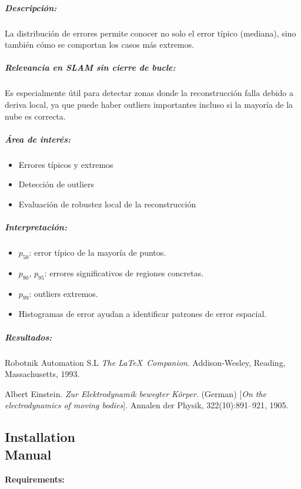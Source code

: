 \documentclass[12pt, a4paper, twoside]{article}
\begin{document}
\subparagraph{Descripción:}
La distribución de errores permite conocer no solo el error típico (mediana), sino también cómo se comportan los casos más extremos.

\subparagraph{Relevancia en SLAM sin cierre de bucle:}
Es especialmente útil para detectar zonas donde la reconstrucción falla debido a deriva local, ya que puede haber outliers 
importantes incluso si la mayoría de la nube es correcta.

\subparagraph{Área de interés:}
\begin{itemize}
  \item Errores típicos y extremos
  \item Detección de outliers
  \item Evaluación de robustez local de la reconstrucción
\end{itemize}

\subparagraph{Interpretación:}
\begin{itemize}
  \item $p_{50}$: error típico de la mayoría de puntos.  
  \item $p_{90}$, $p_{95}$: errores significativos de regiones concretas.  
  \item $p_{99}$: outliers extremos.  
  \item Histogramas de error ayudan a identificar patrones de error espacial.
\end{itemize}

\subparagraph{Resultados:}


\begin{thebibliography}{9}
    Robotnik Automation S.L
    \textit{The \LaTeX\ Companion}. 
    Addison-Wesley, Reading, Massachusetts, 1993.
    
    Albert Einstein. 
    \textit{Zur Elektrodynamik bewegter K{\"o}rper}. (German) 
    [\textit{On the electrodynamics of moving bodies}]. 
    Annalen der Physik, 322(10):891–921, 1905.
\end{thebibliography}

\newpage

\begin{umaappendices}
\section{Installation \\ Manual}
    
    \textbf{\large{Requirements:}}

\end{umaappendices}
\end{document}
